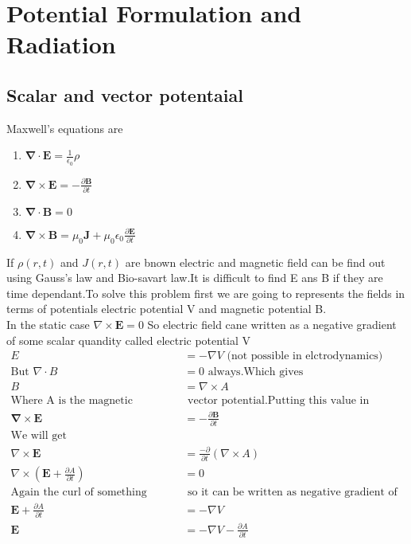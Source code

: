\chapter{Potential Formulation and Radiation}
\section{Scalar and vector potentaial}
Maxwell's equations are
\begin{enumerate}[label=(\roman*)]
	\item $\boldsymbol{\nabla} \cdot \mathbf{E}=\frac{1}{\epsilon_{0}} \rho$
	\item $\boldsymbol{\nabla} \times \mathbf{E}=-\frac{\partial \mathbf{B}}{\partial t}$
	\item $\boldsymbol{\nabla} \cdot \mathbf{B}=0$
	\item $\boldsymbol{\nabla} \times \mathbf{B}=\mu_{0} \mathbf{J}+\mu_{0} \epsilon_{0} \frac{\partial \mathbf{E}}{\partial t}$
\end{enumerate}
If $\rho(r,t)$ and $J(r,t)$ are bnown electric and magnetic field can be find out using Gauss's law and Bio-savart law.It is difficult to find E ans B if they are time dependant.To solve this problem first we are going to represents the fields in terms of potentials electric potential V and magnetic potential B.\\
In the static case $\nabla \times \mathbf{E}=0$ So electric field cane written as a negative gradient of some scalar quandity called electric potential V
\begin{align*}
E&=-\nabla V\text{ (not possible in elctrodynamics)}\\
\text{But }\nabla \cdot B&=0\text{ always.Which gives }\\
B&=\nabla\times A\\
\text{Where A is the magnetic}&\text{ vector potential.Putting this value in }\\
\boldsymbol{\nabla} \times \mathbf{E}&=-\frac{\partial \mathbf{B}}{\partial t}\\
\text{We will get }&\\
\nabla \times \mathbf{E}&=\frac{-\partial }{\partial t}(\nabla \times A)\\
\nabla \times \left( \mathbf{E}+\frac{\partial A}{\partial t}\right) &=0\\
\text{Again the curl of something become zero.}&\text{ so it can be written as negative gradient of potential}\\
\mathbf{E}+\frac{\partial A}{\partial t}&=-\nabla V\\
\mathbf{E}&=-\nabla V-\frac{\partial A}{\partial t}
\end{align*}
